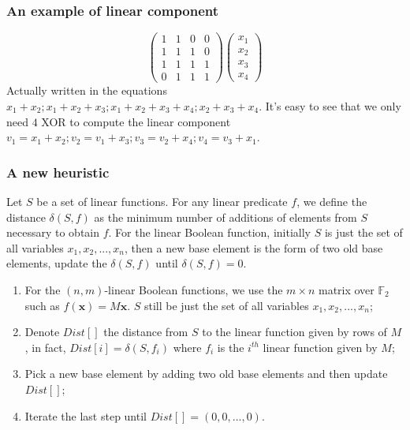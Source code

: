 \documentclass[
    aspectratio=169,                   %
]{beamer}
\newcommand{\F}{\mathbb{F}}
\begin{document}
    \begin{frame}
            \frametitle{An example of linear component}
        
            \begin{example}
                \[\begin{pmatrix}
                    1 &1 &0 &0\\
                    1 &1 &1 &0\\
                    1 &1 &1 &1\\
                    0 &1 &1 &1
                \end{pmatrix}\begin{pmatrix}
                    x_1\\x_2\\x_3\\x_4
                \end{pmatrix}\]
                Actually written in the equations  $ x_1+x_2;x_1+x_2+x_3;x_1+x_2+x_3+x_4;x_2+x_3+x_4. $
                It's easy to see that we only need $ 4 $ XOR to compute the linear component $ v_1=x_1+x_2;v_2=v_1+x_3;v_3=v_2+x_4;v_4=v_3+x_1. $
            \end{example}
        \end{frame}
    
    \begin{frame}
        \frametitle{A new heuristic}
    
        Let $S$ be a set of linear functions. For any linear predicate $f$, we define the distance $\delta(S,f)$ 
        as the minimum number of additions of elements from $S$ necessary to obtain $f$.
        For the linear Boolean function, initially $ S $ is just the set of all variables $ x_1,x_2,...,x_n $,
        then a new base element is the form of two old base elements, update the $ \delta(S,f) $ until $ \delta(S,f)=0 $.
        \begin{enumerate}
            \item For the $ (n,m) $-linear Boolean functions, we use the $ m\times n $ matrix over $ \F_2 $ such as $ f(\textbf{x})=M\textbf{x} $.
            $ S $ still be just the set of all variables $ x_1,x_2,...,x_n $;
            \item Denote $ Dist[] $ the distance from $ S $ to the linear function given by rows of $ M $, 
            in fact, $ Dist[i]=\delta(S,f_i) $ where $ f_i $ is the $ i^{th} $ linear function given by $ M $;
            \item Pick a new base element by adding two old base elements and then update $ Dist[] $;
            \item Iterate the last step until $ Dist[]=(0,0,...,0) $.
        \end{enumerate}
    
    \end{frame}
\end{document}
